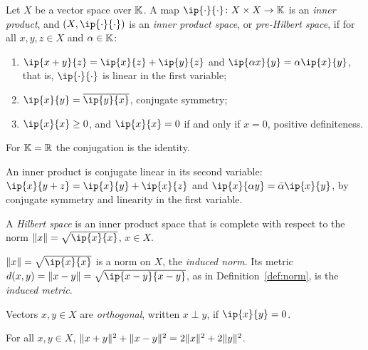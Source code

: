 \begin{definition}\label{def:ip-space}
Let $X$ be a vector space over $\mathbb{K}$. A map
$\ip{\cdot}{\cdot} \colon X \times X \to \K$ is an \emph{inner product}, and
$(X, \ip{\cdot}{\cdot})$ is an \emph{inner product space}, or
\emph{pre-Hilbert space}, if for all $x, y, z \in X$ and $\alpha \in \mathbb{K}$:
\begin{enumerate}
  \item $\ip{x + y}{z} = \ip{x}{z} + \ip{y}{z}$ and
    $\ip{\alpha x}{y} = \alpha \ip{x}{y}$, that is, $\ip{\cdot}{\cdot}$ is
    linear in the first variable;
  \item $\ip{x}{y} = \overline{\ip{y}{x}}$, conjugate symmetry;
  \item $\ip{x}{x} \ge 0$, and $\ip{x}{x} = 0$ if and only if $x = 0$,
    positive definiteness.
\end{enumerate}
For $\mathbb{K} = \mathbb{R}$ the conjugation is the identity.
\end{definition}

\begin{remark}\label{rem:conj-linear}
An inner product is conjugate linear in its second variable:
$\ip{x}{y + z} = \ip{x}{y} + \ip{x}{z}$ and
$\ip{x}{\alpha y} = \bar{\alpha}\ip{x}{y}$, by conjugate symmetry and
linearity in the first variable.
\end{remark}

\begin{definition}\label{def:hilbert}
A \emph{Hilbert space} is an inner product space that is complete with
respect to the norm $\norm{x} = \sqrt{\ip{x}{x}}$, $x \in X$.
\end{definition}

\begin{proposition}\label{prop:induced-norm}
$\norm{x} = \sqrt{\ip{x}{x}}$ is a norm on $X$, the \emph{induced norm}. Its
metric $d(x,y) = \norm{x - y} = \sqrt{\ip{x - y}{x - y}}$, as in
Definition~\ref{def:norm}, is the \emph{induced metric}.
\end{proposition}

\begin{definition}[Orthogonality]\label{def:orthogonal}
Vectors $x, y \in X$ are \emph{orthogonal}, written $x \perp y$, if
$\ip{x}{y} = 0$.
\end{definition}

\begin{proposition}\label{prop:parallelogram}
For all $x, y \in X$,
$\lVert x + y\rVert^2 + \lVert x - y\rVert^2 = 2\lVert x\rVert^2 + 2\lVert y\rVert^2$.
\end{proposition}

